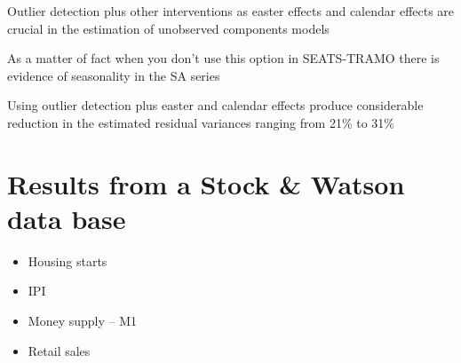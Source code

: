 \begin{slide}
  \begin{center}
  \end{center}
\end{slide}

\begin{slide}
  \begin{wideitemize}
  \item Outlier detection plus other interventions as easter effects
    and calendar effects are crucial in the estimation of unobserved
    components models
  \item As a matter of fact when you don't use this option in
    SEATS-TRAMO there is evidence of seasonality in the SA
    series
  \item Using outlier detection plus easter and calendar effects
    produce considerable reduction in the estimated residual variances
    ranging from 21\% to 31\%
  \end{wideitemize}
\end{slide}

\section[S\&W data]{Results from a Stock \& Watson data base}

\begin{slide}
  
  \begin{itemize}
  \item Housing starts
  \item IPI
  \item Money supply -- M1
  \item Retail sales
  \end{itemize}
\end{slide}

